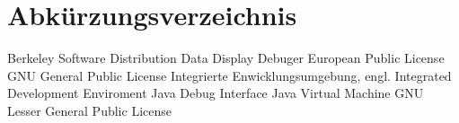 
\chapter*{Abkürzungsverzeichnis}

\begin{acronym}
	 {Berkeley Software Distribution}
	 {Data Display Debuger}
	 {European Public License}
	 {GNU General Public License}
	 {Integrierte Enwicklungsumgebung, engl. Integrated Development Enviroment}
	 {Java Debug Interface}
	 {Java Virtual Machine}
	 {GNU Lesser General Public License}
\end{acronym}
